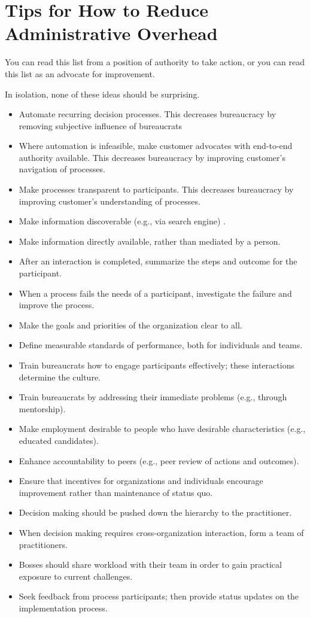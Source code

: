 \section{Tips for How to Reduce Administrative Overhead\label{sec:reducing-overhead}}

You can read this list from a position of authority to take action, or you can read this list as an advocate for improvement. 

In isolation, none of these ideas should be surprising.
\begin{itemize}
    \item Automate recurring decision processes. This decreases bureaucracy by removing subjective influence of bureaucrats
\item Where automation is infeasible, make customer advocates with end-to-end authority available. 
This decreases bureaucracy by improving customer's navigation of processes.
\item Make processes transparent to participants. 
This decreases bureaucracy by improving customer's understanding of processes.
\item Make information discoverable (e.g., via search engine) .
\item Make information directly available, rather than mediated by a person.
\item After an interaction is completed, summarize the steps and outcome for the participant. 
\item When a process fails the needs of a participant, investigate the failure and improve the process.
\item Make the goals and priorities of the organization clear to all.
\item Define measurable standards of performance, both for individuals and teams.
\item Train bureaucrats how to engage participants effectively; these interactions determine the culture.
\item Train bureaucrats by addressing their immediate problems (e.g., through mentorship).
\item Make employment desirable to people who have desirable characteristics (e.g., educated candidates).
\item Enhance accountability to peers (e.g., peer review of actions and outcomes).
\item Ensure that incentives for organizations and individuals encourage improvement rather than maintenance of status quo.
\item Decision making should be pushed down the hierarchy to the practitioner.
\item When decision making requires cross-organization interaction, form a team of practitioners.
\item Bosses should share workload with their team in order to gain practical exposure to current challenges.
\item Seek feedback from process participants; then provide status updates on the implementation process.


\end{itemize}
